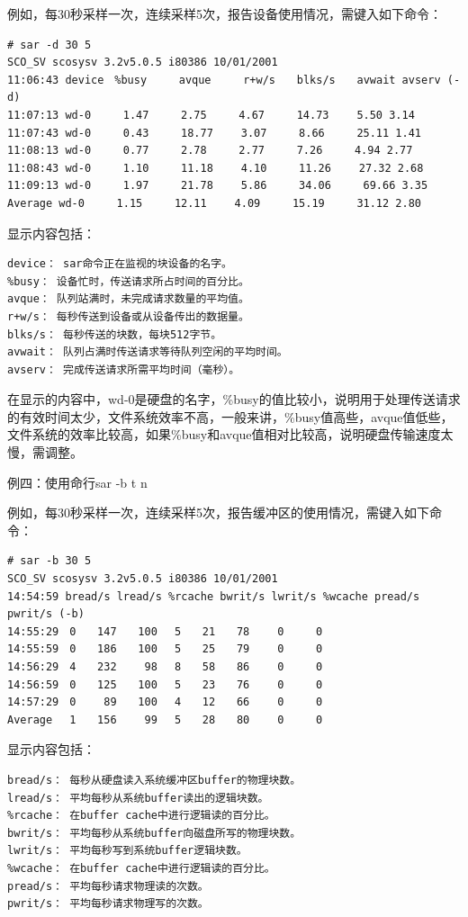 例如，每30秒采样一次，连续采样5次，报告设备使用情况，需键入如下命令：
\begin{verbatim}
# sar -d 30 5
SCO_SV scosysv 3.2v5.0.5 i80386 10/01/2001
11:06:43 device　%busy　　　avque　　　r+w/s　　blks/s　　avwait avserv (-d)
11:07:13 wd-0　　　1.47　　　2.75　　　4.67　　　14.73　　 5.50 3.14
11:07:43 wd-0　　　0.43　　　18.77　　 3.07　　　8.66　　　25.11 1.41
11:08:13 wd-0　　　0.77　　　2.78　　　2.77　　　7.26　　　4.94 2.77
11:08:43 wd-0　　　1.10　　　11.18　　 4.10　　　11.26　　 27.32 2.68
11:09:13 wd-0　　　1.97　　　21.78　　 5.86　　　34.06　　　69.66 3.35
Average wd-0　　　1.15　　　12.11　　 4.09　　　15.19　　　31.12 2.80
\end{verbatim}

显示内容包括：
\begin{verbatim}
device： sar命令正在监视的块设备的名字。
%busy： 设备忙时，传送请求所占时间的百分比。
avque： 队列站满时，未完成请求数量的平均值。
r+w/s： 每秒传送到设备或从设备传出的数据量。
blks/s： 每秒传送的块数，每块512字节。
avwait： 队列占满时传送请求等待队列空闲的平均时间。
avserv： 完成传送请求所需平均时间（毫秒）。
\end{verbatim}

在显示的内容中，wd-0是硬盘的名字，\%busy的值比较小，说明用于处理传送请求
的有效时间太少，文件系统效率不高，一般来讲，\%busy值高些，avque值低些，
文件系统的效率比较高，如果\%busy和avque值相对比较高，说明硬盘传输速度太
慢，需调整。

例四：使用命行sar -b t n

例如，每30秒采样一次，连续采样5次，报告缓冲区的使用情况，需键入如下命令：
\begin{verbatim}
# sar -b 30 5
SCO_SV scosysv 3.2v5.0.5 i80386 10/01/2001
14:54:59 bread/s lread/s %rcache bwrit/s lwrit/s %wcache pread/s pwrit/s (-b)
14:55:29　0　　147　　100　 5　　21　　78　　 0　　　0
14:55:59　0　　186　　100　 5　　25　　79　　 0　　　0
14:56:29　4　　232 　　98　 8　　58　　86　　 0　　　0
14:56:59　0　　125　　100　 5　　23　　76　　 0　　　0
14:57:29　0　　 89　　100　 4　　12　　66　　 0　　　0
Average　 1　　156 　　99　 5　　28　　80　　 0　　　0
\end{verbatim}

显示内容包括：
\begin{verbatim}
bread/s： 每秒从硬盘读入系统缓冲区buffer的物理块数。
lread/s： 平均每秒从系统buffer读出的逻辑块数。
%rcache： 在buffer cache中进行逻辑读的百分比。
bwrit/s： 平均每秒从系统buffer向磁盘所写的物理块数。
lwrit/s： 平均每秒写到系统buffer逻辑块数。
%wcache： 在buffer cache中进行逻辑读的百分比。
pread/s： 平均每秒请求物理读的次数。
pwrit/s： 平均每秒请求物理写的次数。
\end{verbatim}

